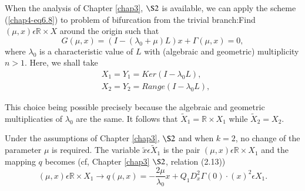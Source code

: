 \medskip
{}

When the analysis of Chapter \ref{chap3}, $\S 2$ is available, we can
apply the scheme (\ref{chap4-eq6.8}) to problem of bifurcation from
the trivial branch:\pageoriginale Find $(\mu, x) \epsilon \mathbb{R}
\times X$ around the origin such that
\begin{equation*}
G(\mu, x) = (I - (\lambda_{0} + \mu)L) x + \Gamma(\mu, x) = 0,\tag{6.9}\label{chap4-eq6.9}
\end{equation*}
where $\lambda_{0}$ is a characteristic value of $L$ with (algebraic and
geometric) multiplicity $n > 1$. Here, we shall take
\begin{align*}
& X_{1} = Y_{1} = Ker (I - \lambda_{0}L),\\
& X_{2} = Y_{2} = Range (I - \lambda_{0}L),
\end{align*}

This choice being possible precisely because the algebraic and
geometric multiplicaties of $\lambda_{0}$ are the same. It follows
that $\widetilde{X}_{1} = \mathbb{R} \times X_{1}$ while
$\widetilde{X}_{2} = X_{2}$.

Under the assumptions of Chapter \ref{chap3}, $\S 2$ and when $k = 2$,
no change of the parameter $\mu$ is required. The variable
$\widetilde{x} \epsilon \widetilde{X}_{1}$ is the pair $(\mu, x)
\epsilon \mathbb{R} \times X_{1}$ and the mapping $q$ becomes (cf,
Chapter \ref{chap3} $\S 2$, relation (2.13))
$$
(\mu, x) \epsilon \mathbb{R} \times X_{1} \to q(\mu, x) =
-\frac{2\mu}{\lambda_{0}}x + Q_{1}D_{x}^{2}\Gamma(0) \cdot (x)^{2}
\epsilon X_{1}.
$$

